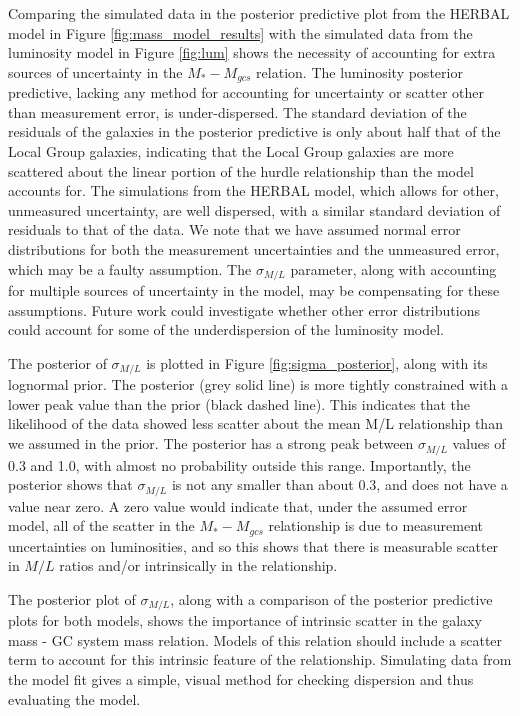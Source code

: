 \documentclass[twocolumn]{aastex631}
\begin{document}
Comparing the simulated data in the posterior predictive plot from the HERBAL model in Figure \ref{fig:mass_model_results} with the simulated data from the luminosity model in Figure \ref{fig:lum} shows the necessity of accounting for extra sources of uncertainty in the $M_*-M_{gcs}$ relation. The luminosity posterior predictive, lacking any method for accounting for uncertainty or scatter other than measurement error, is under-dispersed. The standard deviation of the residuals of the galaxies in the posterior predictive is only about half that of the Local Group galaxies, indicating that the Local Group galaxies are more scattered about the linear portion of the hurdle relationship than the model accounts for. The simulations from the HERBAL model, which allows for other, unmeasured uncertainty, are well dispersed, with a similar standard deviation of residuals to that of the data. We note that we have assumed normal error distributions for both the measurement uncertainties and the unmeasured error, which may be a faulty assumption. The $\sigma_{M/L}$ parameter, along with accounting for multiple sources of uncertainty in the model, may be compensating for these assumptions. Future work could investigate whether other error distributions could account for some of the underdispersion of the luminosity model.

The posterior of $\sigma_{M/L}$ is plotted in Figure \ref{fig:sigma_posterior}, along with its lognormal prior. The posterior (grey solid line) is more tightly constrained with a lower peak value than the prior (black dashed line). This indicates that the likelihood of the data showed less scatter about the mean M/L relationship than we assumed in the prior. The posterior has a strong peak between $\sigma_{M/L}$ values of 0.3 and 1.0, with almost no probability outside this range. Importantly, the posterior shows that $\sigma_{M/L}$ is not any smaller than about 0.3, and does not have a value near zero. A zero value would indicate that, under the assumed error model, all of the scatter in the $M_*-M_{gcs}$ relationship is due to measurement uncertainties on luminosities, and so this shows that there is measurable scatter in $M/L$ ratios and/or intrinsically in the relationship.

The posterior plot of $\sigma_{M/L}$, along with a comparison of the posterior predictive plots for both models, shows the importance of intrinsic scatter in the galaxy mass - GC system mass relation. Models of this relation should include a scatter term to account for this intrinsic feature of the relationship. Simulating data from the model fit gives a simple, visual method for checking dispersion and thus evaluating the model.
\end{document}
